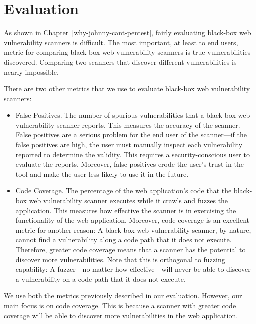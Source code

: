 

\section{Evaluation}

As shown in Chapter~\ref{why-johnny-cant-pentest}, fairly evaluating
black-box web vulnerability scanners is difficult. The most important, at least
to end users, metric for comparing black-box web vulnerability scanners is true
vulnerabilities discovered. Comparing two scanners that discover different
vulnerabilities is nearly impossible. 

There are two other metrics that we use to evaluate black-box web vulnerability
scanners:
\begin{itemize}
  \item{}False Positives. The number of spurious vulnerabilities that a
    black-box web vulnerability scanner reports. This measures the accuracy of
    the scanner. False positives are a serious problem for the end user of the
    scanner---if the false positives are high, the user must manually inspect
    each vulnerability reported to determine the validity. This requires a
    security-conscious user to evaluate the reports. Moreover, false positives
    erode the user's trust in the tool and make the user less likely to use
    it in the future.

  \item{}Code Coverage. The percentage of the web application's code that the
    black-box web vulnerability scanner executes while it crawls and fuzzes the
    application. This measures how effective the scanner is in exercising the
    functionality of the web application. Moreover, code coverage is an
    excellent metric for another reason: A black-box web vulnerability scanner,
    by nature, cannot find a vulnerability along a code path that it does not
    execute. Therefore, greater code coverage means that a scanner has the
    potential to discover more vulnerabilities. Note that this is orthogonal to
    fuzzing capability: A fuzzer---no matter how effective---will never be able
    to discover a vulnerability on a code path that it does not execute.
\end{itemize}

We use both the metrics previously described in our evaluation. However, our main focus is on code
coverage. This is because a scanner with greater code coverage will be able to
discover more vulnerabilities in the web application.


